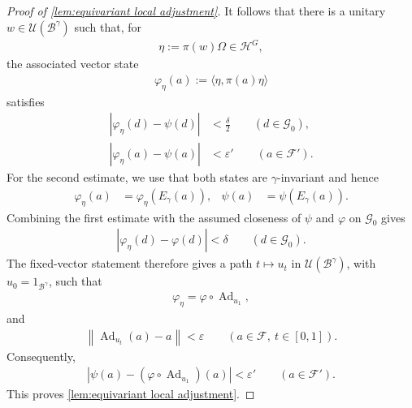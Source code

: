 \documentclass[a4paper,10pt]{article}
\numberwithin{equation}{section}
\theoremstyle{plain}
\theoremstyle{plain}
\theoremstyle{plain}
\theoremstyle{plain}
\theoremstyle{plain}
\theoremstyle{remark}
\theoremstyle{definition}
\newcommand{\calB}{\mathcal{B}}
\newcommand{\calF}{\mathcal{F}}
\newcommand{\calG}{\mathcal{G}}
\newcommand{\calU}{\mathcal{U}}
\newcommand{\calH}{\mathcal{H}}
\newcommand\norm[1]{\left\lVert#1\right\rVert}
\newcommand{\ip}[2]{\langle #1, #2 \rangle}
\newcommand{\Ad}[1]{\operatorname{Ad}_{#1}}
\newcommand{\eq}[1]{\begin{align*}#1\end{align*}}
\newcommand{\br}[1]{\left(#1\right)}
\begin{document}
\begin{proof}[Proof of \cref{lem:equivariant local adjustment}]
It follows that there is a unitary \(w\in\calU(\calB^\gamma)\) such
that, for
\eq{
    \eta
    :=
    \pi(w)\Omega
    \in
    \calH^G,
}
the associated vector state
\eq{
    \varphi_\eta(a)
    :=
    \ip{\eta}{\pi(a)\eta}
}
satisfies
\eq{
    \left|
        \varphi_\eta(d)-\psi(d)
    \right|
    &<
    \frac{\delta}{2}
    \qquad
    (d\in\calG_0),\\
    \left|
        \varphi_\eta(a)-\psi(a)
    \right|
    &<
    \varepsilon'
    \qquad
    (a\in\calF').
}
For the second estimate, we use that both states are
\(\gamma\)-invariant and hence
\eq{
    \varphi_\eta(a)
    &=
    \varphi_\eta(E_\gamma(a)),&
    \psi(a)
    &=
    \psi(E_\gamma(a)).
}
Combining the first estimate with the assumed closeness of
\(\psi\) and \(\varphi\) on \(\calG_0\) gives
\eq{
    \left|
        \varphi_\eta(d)-\varphi(d)
    \right|
    <
    \delta
    \qquad
    (d\in\calG_0).
}
The fixed-vector statement therefore gives a path
\(t\mapsto u_t\) in \(\calU(\calB^\gamma)\), with
\(u_0=1_{\calB^\gamma}\), such that
\eq{
    \varphi_\eta
    =
    \varphi\circ\Ad{u_1},
}
and
\eq{
    \norm{
        \Ad{u_t}(a)-a
    }
    <
    \varepsilon
    \qquad
    (a\in\calF,\ t\in[0,1]).
}
Consequently,
\eq{
    \left|
        \psi(a)
        -
        \br{
            \varphi\circ\Ad{u_1}
        }(a)
    \right|
    <
    \varepsilon'
    \qquad
    (a\in\calF').
}
This proves
\cref{lem:equivariant local adjustment}.
\end{proof}
\newpage
\begingroup
\let\itshape\upshape
\printbibliography
\endgroup
\end{document}

